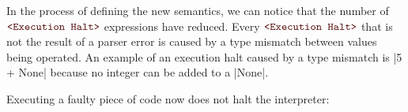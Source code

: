 %
%
%
%
%
%
%
%
%
%

In the process of defining the new semantics, we can notice that the number of
\(\Halt\) expressions have reduced. Every \(\Halt\) that is
not the result of a parser error is caused by a type mismatch between values being
operated. An example of an execution halt caused by a type mismatch is \pycode|5 + None|
because no integer can be added to a \pycode|None|.

Executing a faulty piece of code now does not halt the interpreter:

